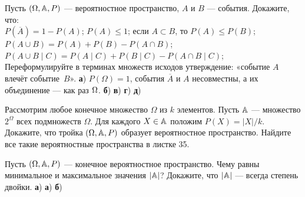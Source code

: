 \documentclass[a4paper,11pt]{article}
\begin{document}
\vspace*{-3mm}





Пусть $(\Omega ,\mathbb{A}, P)$ --- вероятностное пространство, $A$ и $B$ — события.
Докажите, что:
\\
$P(\overline{A})=1-P(A)$;
$P(A)\le 1$;
если $A\subset B$, то $P(A)\le P(B)$;
\\
$P(A\cup B) = P(A) + P(B) - P(A\cap B)$;
$P(A\cup B\mid C) = P(A\mid C) + P(B\mid C) - P(A\cap B\mid C)$;
\\
Переформулируйте в терминах множеств исходов утверждение: «событие $A$ влечёт событие~$B$».
\textbf{а})
$P(\Omega)=1$, события $\overline {A}$ и $A$ несовместны, а их объединение — как раз $\Omega$.
\textbf{б})
\textbf{в})
\textbf{г})
\textbf{д})
















Рассмотрим любое
конечное множество $\Omega $ из $k$ элементов.
Пусть $\mathbb{A}$ --- множество $2^\Omega$ всех подмножеств $\Omega$.
Для каждого $X\in\mathbb{A}$ положим $P(X)=|X|/k$.
Докажите, что тройка $(\Omega ,\mathbb{A}, P)$ образует вероятностное пространство.
Найдите все такие вероятностные пространства в листке 35.

























Пусть $(\Omega ,\mathbb{A}, P)$ --- конечное вероятностное пространство.
Чему равны минимальное и максимальное значения $|\mathbb{A}|$?
Докажите, что $|\mathbb{A}|$ — всегда степень двойки.
\textbf{а})
\textbf{а})
\textbf{б})
\end{document}
